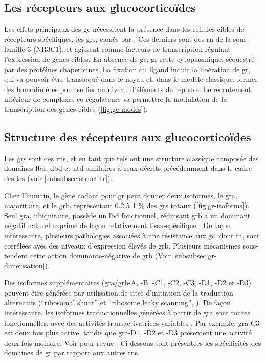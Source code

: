 \documentclass[../main.tex]{subfiles}
\begin{document}
	\subsection{Les récepteurs aux glucocorticoïdes}
		Les effets principaux des \gls{gc} nécessitent la présence dans les cellules cibles de récepteurs spécifiques, les \glspl{gr}, clonés par \citep{Weinberger1985}.
		Ces derniers sont des \gls{rn} de la sous-famille 3 (NR3C1), et agissent comme facteurs de transcription régulant l'expression de gènes cibles.
		En absence de \gls{gc}, \gls{gr} reste cytoplasmique, séquestré par des protéines chaperonnes.
		La fixation du ligand induit la libération de \gls{gr}, qui va pouvoir être transloqué dans le noyau et, dans le modèle classique, former des homodimères pour se lier au niveau d'éléments de réponse.
		Le recrutement ultérieur de complexes co-régulateurs va permettre la modulation de la transcription des gènes cibles (\autoref{fig:gc-modes}).

		


	\subsection{Structure des récepteurs aux glucocorticoïdes}
		Les \glspl{gr} sont des \glspl{rn}, et en tant que tels ont une structure classique composée des domaines \gls{lbd}, \gls{dbd} et \gls{ntd} similaires à ceux décrits précédemment dans le cadre des \glspl{tr} (voir \autoref{subsubsec:struct-tr}).
		\par
		Chez l'humain, le gène codant pour \gls{gr} peut donner deux isoformes, le \gls{gra}, majoritaire, et le \gls{grb}, représentant 0.2 à 1 \% des \glspl{gr} totaux (\autoref{fig:gr-isoforms}).
		Seul \gls{gra}, ubiquitaire, possède un \gls{lbd} fonctionnel, réduisant \gls{grb} a un dominant négatif naturel exprimé de façon relativement tissu-spécifique \citep{Lu2004}.
		De façon intéressante, plusieurs pathologies associées à une résistance aux \gls{gc}, dont \gls{ra}, sont corrélées avec des niveaux d'expression élevés de \gls{grb}.
		Plusieurs mécanismes sous-tendent cette action dominante-négative de \gls{grb} (Voir \autoref{subsubsec:gr-dimerisation}).
		\par
		Des isoformes supplémentaires (\gls{gra}/\gls{grb}-A, -B, -C1, -C2, -C3, -D1, -D2 et -D3) peuvent être générées par utilisation de sites d'initiation de la traduction alternatifs (``ribosomal shunt'' et ``ribosome leaky scanning'', \citealp{Lu2005}).
		De façon intéressante, les isoformes traductionnelles générées à partir de \gls{gra} sont toutes fonctionnelles, avec des activités transactivatrices variables \citep{Lu2005}.
		Par exemple, \gls{gra}-C3 est deux fois plus active, tandis que \gls{gra}-D1, -D2 et -D3 présentent une activité deux fois moindre.
		Voir pour revue \citep{Lu2006}.
		Ci-dessous sont présentées les spécificités des domaines de \gls{gr} par rapport aux autres \glspl{rn}.
\end{document}
